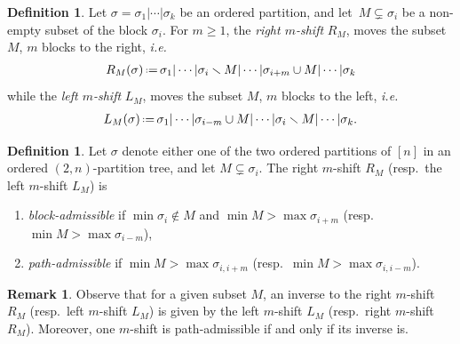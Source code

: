 \documentclass{amsart}
\newcommand{\darkblue}{\color{darkblue}} %
\theoremstyle{definition}
\newtheorem{definition}[theorem]{Definition}
\newtheorem{remark}[theorem]{Remark}
\newcommand{\ssm}{\smallsetminus} %
\newcommand{\eqdef}{\mbox{\,\raisebox{0.2ex}{\scriptsize\ensuremath{\mathrm:}}\ensuremath{=}\,}} %
\newcommand{\ie}{\textit{i.e.}~} %
\newcommand{\resp}{resp.~} %
\newcommand{\defn}[1]{\textsl{\darkblue #1}} %
\begin{document}
\begin{definition}
\label{def:subset shifts}
Let $\sigma=\sigma_1| \cdots |\sigma_k$ be an ordered partition, and let~$M \subsetneq \sigma_{i}$ be a non-empty subset of the block $\sigma_i$.
For $m\geq 1$, the \defn{right $m$-shift} $R_M$, moves the subset $M$, $m$ blocks to the right, \ie
\begin{align*}
R_M(\sigma) \eqdef \sigma_1 | \cdots | \sigma_i \ssm M | \cdots | \sigma_{i+m} \cup M | \cdots | \sigma_k
\end{align*}
while the \defn{left $m$-shift} $L_M$, moves the subset $M$, $m$ blocks to the left, \ie
\begin{align*}
L_M(\sigma) \eqdef \sigma_1 | \cdots | \sigma_{i-m} \cup M | \cdots | \sigma_{i} \ssm M | \cdots | \sigma_k .
\end{align*}
\end{definition}

\begin{definition}
\label{def:movable-subsets}
Let $\sigma$ denote either one of the two ordered partitions of $[n]$ in an ordered \mbox{$(2,n)$-partition} tree, and let $M \subsetneq \sigma_i$.
The right $m$-shift $R_M$ (\resp the left $m$-shift $L_M$) is 
\begin{enumerate}
\item \defn{block-admissible} if $\min \sigma_i \notin M$ and $\min M > \max \sigma_{i+m}$ (\resp $\min M > \max \sigma_{i-m}$),
\item \defn{path-admissible} if $\min M > \max \sigma_{i,i+m}$ (\resp $\min M > \max \sigma_{i,i-m}$).
\end{enumerate}
\end{definition}

\begin{remark}
\label{rem:inverses}
Observe that for a given subset $M$, an inverse to the right $m$-shift $R_M$ (\resp left $m$-shift $L_M$) is given by the left $m$-shift $L_M$ (\resp right $m$-shift $R_M$).
Moreover, one $m$-shift is path-admissible if and only if its inverse is. 
\end{remark}
\end{document}
